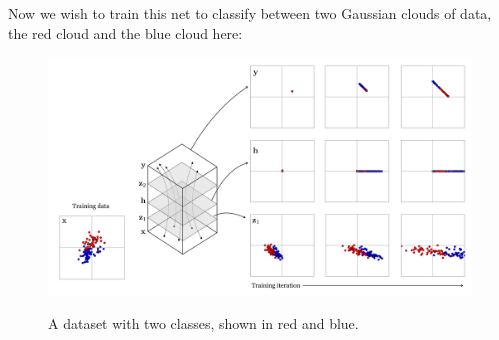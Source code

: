 


Now we wish to train this net to classify between two Gaussian clouds of data, the red cloud and the blue cloud here:
\begin{figure}[h]
    \centerline{
    \includegraphics[width=0.28\linewidth]{./figures/neural_nets/binary_classifier_example_training_data.pdf}
    \label{fig:intro_to_learning:neural_nets/binary_classifier_example_training_data}
    }
    \caption{A dataset with two classes, shown in red and blue.}
    \label{fig:neural_nets:two_class_dataset}
\end{figure}

